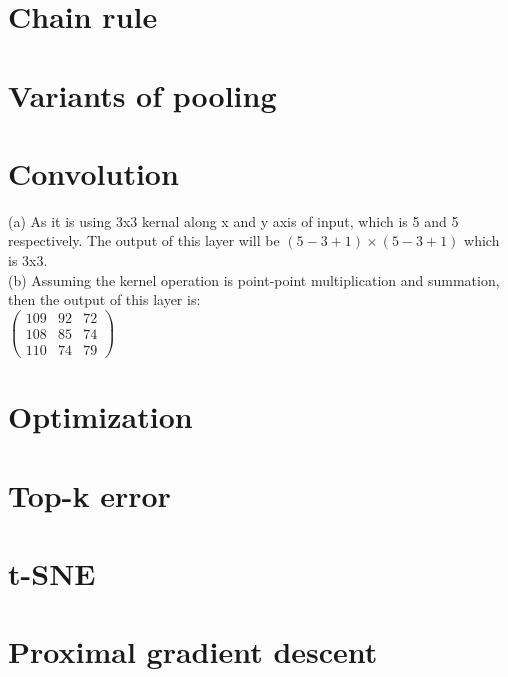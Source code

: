 \documentclass{article}
\begin{document}
\section{Chain rule}
\section{Variants of pooling}
\section{Convolution}
(a) As it is using 3x3 kernal along x and y axis of input, which is 5 and 5 respectively. The output of this layer will be $(5-3+1)\times(5-3+1)$ which is 3x3.\\
(b) Assuming the kernel operation is point-point multiplication and summation, then the output of this layer is:\\
$\begin{pmatrix}
  109 & 92 & 72 \\
  108 & 85 & 74 \\
  110 & 74 & 79
\end{pmatrix}$
\section{Optimization}
\section{Top-k error}
\section{t-SNE}
\section{Proximal gradient descent}
\end{document}
